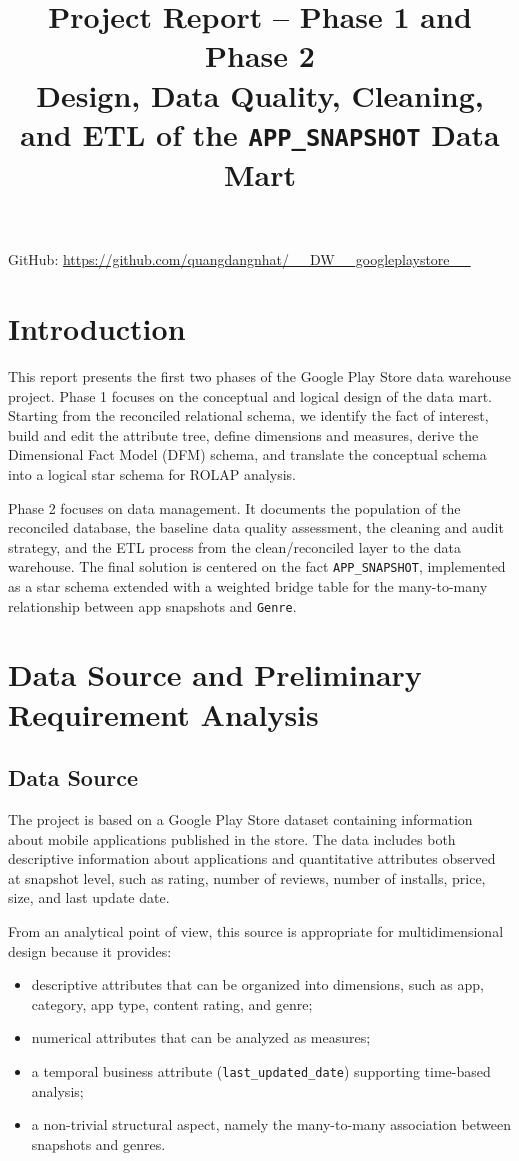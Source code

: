 \documentclass[11pt,a4paper]{article}
\title{Project Report -- Phase 1 and Phase 2\\Design, Data Quality, Cleaning, and ETL of the \texttt{APP\_SNAPSHOT} Data Mart}
\author{}
\date{}
\begin{document}
\maketitle

GitHub: \url{https://github.com/quangdangnhat/__DW__googleplaystore__}

\section{Introduction}
This report presents the first two phases of the Google Play Store data warehouse project. Phase 1 focuses on the conceptual and logical design of the data mart. Starting from the reconciled relational schema, we identify the fact of interest, build and edit the attribute tree, define dimensions and measures, derive the Dimensional Fact Model (DFM) schema, and translate the conceptual schema into a logical star schema for ROLAP analysis.

Phase 2 focuses on data management. It documents the population of the reconciled database, the baseline data quality assessment, the cleaning and audit strategy, and the ETL process from the clean/reconciled layer to the data warehouse. The final solution is centered on the fact \texttt{APP\_SNAPSHOT}, implemented as a star schema extended with a weighted bridge table for the many-to-many relationship between app snapshots and \texttt{Genre}.

\section{Data Source and Preliminary Requirement Analysis}

\subsection{Data Source}
The project is based on a Google Play Store dataset containing information about mobile applications published in the store. The data includes both descriptive information about applications and quantitative attributes observed at snapshot level, such as rating, number of reviews, number of installs, price, size, and last update date.

From an analytical point of view, this source is appropriate for multidimensional design because it provides:
\begin{itemize}[leftmargin=1.5em]
    \item descriptive attributes that can be organized into dimensions, such as app, category, app type, content rating, and genre;
    \item numerical attributes that can be analyzed as measures;
    \item a temporal business attribute (\texttt{last\_updated\_date}) supporting time-based analysis;
    \item a non-trivial structural aspect, namely the many-to-many association between snapshots and genres.
\end{itemize}
\end{document}
